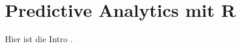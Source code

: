 \documentclass[12pt,a4paper,listof=totoc,oneside]{scrreprt}
\begin{document}

\appendix



\chapter{Predictive Analytics mit R}

Hier ist die Intro \cite{Intro_R}.








\listoffigures
\listoftables
\printglossary[title=Glossar]
\printglossary[type=\acronymtype, title=Akronyme]

{}

\end{document}
